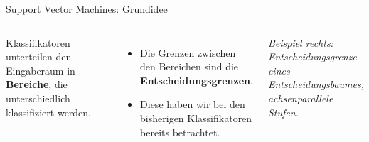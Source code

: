
\begin{frame}{Support Vector Machines: Grundidee}
\begin{columns}
Klassifikatoren unterteilen den Eingaberaum in \textbf{Bereiche}, die
unterschiedlich klassifiziert werden.

\vspace{0.4em}
\begin{itemize}
  \item Die Grenzen zwischen den Bereichen sind die
        \textbf{Entscheidungsgrenzen}.
  \item Diese haben wir bei den bisherigen Klassifikatoren bereits
        betrachtet.
\end{itemize}

\vspace{0.4em}
{\footnotesize\itshape Beispiel rechts: Entscheidungsgrenze eines
Entscheidungsbaumes, achsenparallele Stufen.}

\centering

\end{columns}
\end{frame}


